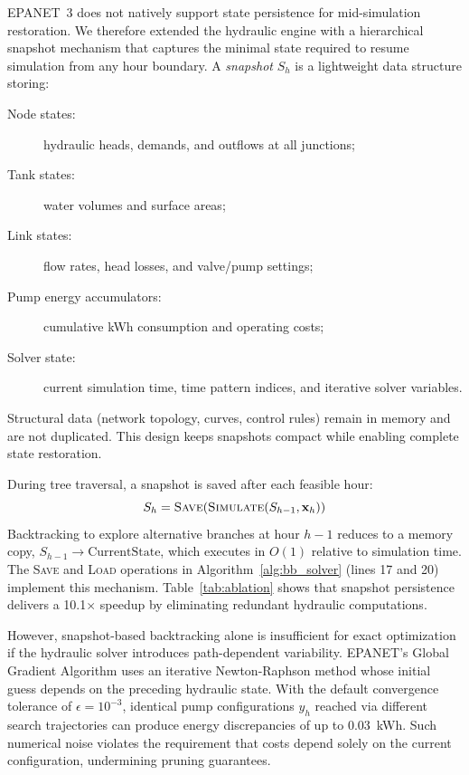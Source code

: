 \documentclass[final,3p,twocolumn]{elsarticle}
\begin{document}
EPANET~3 does not natively support state persistence for mid-simulation restoration. We therefore extended the hydraulic engine with a hierarchical snapshot mechanism that captures the minimal state required to resume simulation from any hour boundary. A \emph{snapshot} $S_h$ is a lightweight data structure storing:
\begin{description}
	\item[Node states:] hydraulic heads, demands, and outflows at all junctions;
	\item[Tank states:] water volumes and surface areas;
	\item[Link states:] flow rates, head losses, and valve/pump settings;
	\item[Pump energy accumulators:] cumulative kWh consumption and operating costs;
	\item[Solver state:] current simulation time, time pattern indices, and iterative solver variables.
\end{description}
Structural data (network topology, curves, control rules) remain in memory and are not duplicated. This design keeps snapshots compact while enabling complete state restoration.

During tree traversal, a snapshot is saved after each feasible hour:
\begin{equation}
	S_h = \textsc{Save}(\textsc{Simulate}(S_{h-1}, \mathbf{x}_h))
\end{equation}
Backtracking to explore alternative branches at hour $h-1$ reduces to a memory copy, $S_{h-1} \to \text{CurrentState}$, which executes in $O(1)$ relative to simulation time. The \textsc{Save} and \textsc{Load} operations in Algorithm~\ref{alg:bb_solver} (lines 17 and 20) implement this mechanism. Table~\ref{tab:ablation} shows that snapshot persistence delivers a 10.1$\times$ speedup by eliminating redundant hydraulic computations.

However, snapshot-based backtracking alone is insufficient for exact optimization if the hydraulic solver introduces path-dependent variability. EPANET's Global Gradient Algorithm uses an iterative Newton-Raphson method whose initial guess depends on the preceding hydraulic state. With the default convergence tolerance of $\epsilon = 10^{-3}$, identical pump configurations $y_h$ reached via different search trajectories can produce energy discrepancies of up to 0.03~kWh. Such numerical noise violates the requirement that costs depend solely on the current configuration, undermining pruning guarantees.
\end{document}
